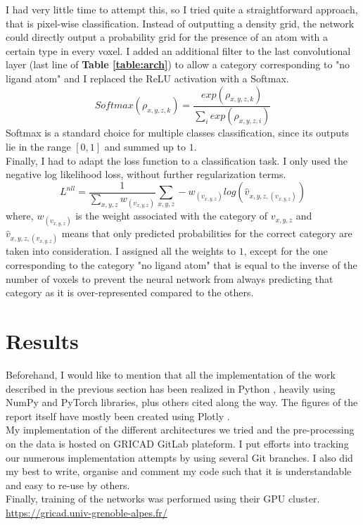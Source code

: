 \documentclass{article}
\begin{document}
I had very little time to attempt this, so I tried quite a straightforward approach, that is pixel-wise classification. Instead of outputting a density grid, the network could directly output a probability grid for the presence of an atom with a certain type in every voxel. I added an additional filter to the last convolutional layer (last line of \textbf{Table \ref{table:arch}}) to allow a category corresponding to "no ligand atom" and I replaced the ReLU activation with a Softmax.
$$
Softmax(\rho_{x,y,z,k}) = \frac{exp(\rho_{x,y,z,k})}{\sum_i exp(\rho_{x,y,z,i})}
$$
Softmax is a standard choice for multiple classes classification, since its outputs lie in the range $[0,1]$ and summed up to $1$. \\
Finally, I had to adapt the loss function to a classification task. I only used the negative log likelihood loss, without further regularization terms.
$$
L^{nll} = \frac{1}{\sum_{x,y,z} w_{(v_{x,y,z})}}\sum_{x,y,z} -w_{(v_{x,y,z})}log(\hat{v}_{x,y,z,(v_{x,y,z})})
$$
where, $w_{(v_{x,y,z})}$ is the weight associated with the category of $v_{x,y,z}$ and $\hat{v}_{x,y,z,(v_{x,y,z})}$ means that only predicted probabilities for the correct category are taken into consideration. I assigned all the weights to $1$, except for the one corresponding to the category "no ligand atom" that is equal to the inverse of the number of voxels to prevent the neural network from always predicting that category as it is over-represented compared to the others.

\clearpage

\section{Results}

Beforehand, I would like to mention that all the implementation of the work described in the previous section has been realized in Python \cite{Python}, heavily using NumPy \cite{NumPy} and  PyTorch \cite{PyTorch} libraries, plus others cited along the way. The figures of the report itself have mostly been created using Plotly \cite{Plotly}. \\
My implementation of the different architectures we tried and the pre-processing on the data is hosted on GRICAD GitLab plateform. I put efforts into tracking our numerous implementation attempts by using several Git branches. I also did my best to write, organise and comment my code such that it is understandable and easy to re-use by others. \\
Finally, training of the networks was performed using their GPU cluster. \url{https://gricad.univ-grenoble-alpes.fr/} \\
\end{document}
